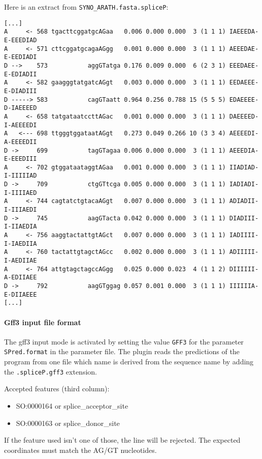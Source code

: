 Here is an extract from \texttt{SYNO\_ARATH.fasta.spliceP}:
\begin{Verbatim}[fontsize=\small]
[...]
A     <- 568 tgacttcggatgcAGaa   0.006 0.000 0.000  3 (1 1 1) IAEEEDA-E-EEEDIAD
A     <- 571 cttcggatgcagaAGgg   0.001 0.000 0.000  3 (1 1 1) AEEEDAE-E-EEDIADI
D -->    573           aggGTatga 0.176 0.009 0.000  6 (2 3 1) EEEDAEE-E-EDIADII
A     <- 582 gaagggtatgatcAGgt   0.003 0.000 0.000  3 (1 1 1) EEDAEEE-E-DIADIII
D -----> 583           cagGTaatt 0.964 0.256 0.788 15 (5 5 5) EDAEEEE-D-IAEEEED
A     <- 658 tatgataatccttAGac   0.001 0.000 0.000  3 (1 1 1) DAEEEED-I-AEEEEDI
A   <--- 698 ttgggtggataatAGgt   0.273 0.049 0.266 10 (3 3 4) AEEEEDI-A-EEEEDII
D ->     699           tagGTagaa 0.006 0.000 0.000  3 (1 1 1) AEEEDIA-E-EEEDIII
A     <- 702 gtggataataggtAGaa   0.001 0.000 0.000  3 (1 1 1) IIADIAD-I-IIIIIAD
D ->     709           ctgGTtcga 0.005 0.000 0.000  3 (1 1 1) IADIADI-I-IIIIAED
A     <- 744 cagtatctgtacaAGgt   0.007 0.000 0.000  3 (1 1 1) ADIADII-I-IIIAEDI
D ->     745           aagGTacta 0.042 0.000 0.000  3 (1 1 1) DIADIII-I-IIAEDIA
A     <- 756 aaggtactattgtAGct   0.007 0.000 0.000  3 (1 1 1) IADIIII-I-IAEDIIA
A     <- 760 tactattgtagctAGcc   0.002 0.000 0.000  3 (1 1 1) ADIIIII-I-AEDIIAE
A     <- 764 attgtagctagccAGgg   0.025 0.000 0.023  4 (1 1 2) DIIIIII-A-EDIIAEE
D ->     792           aagGTggag 0.057 0.001 0.000  3 (1 1 1) IIIIIIA-E-DIIAEEE
[...]
\end{Verbatim}

\paragraph{Gff3 input file format}

The gff3 input mode is activated by setting the value \texttt{GFF3}
for the parameter \texttt{SPred.format} in the parameter file.  The
plugin reads the predictions of the program from one file which name
is derived from the sequence name by adding the \texttt{.spliceP.gff3}
extension.

Accepted features (third column):\\
\begin{itemize}
\item  SO:0000164 or splice\_acceptor\_site 
\item  SO:0000163 or splice\_donor\_site 
\end{itemize}
If the feature used isn't one of those, the line will be rejected. The
expected coordinates must match the AG/GT nucleotides.

